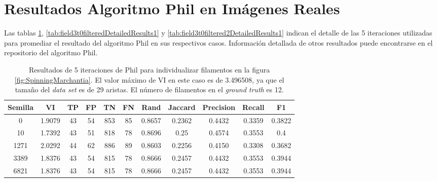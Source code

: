 \section{Resultados Algoritmo Phil en Im\'agenes Reales}

Las tablas \ref{tab:SpinningMarchantiaDetailedResults1},  \ref{tab:field3t0filteredDetailedResults1} y \ref{tab:field3t0filtered2DetailedResults1} indican el detalle de las 5 iteraciones utilizadas para promediar el resultado del algoritmo Phil en sus respectivos casos. Informaci\'on detallada de otros resultados puede encontrarse en el repositorio del algoritmo Phil.

\begin{table}[h]
    \centering
    \begin{tabular}{|c|c|c|c|c|c|c|c|c|c|c|}
    \hline
        Semilla & VI & TP & FP &TN &FN & Rand	& Jaccard &	Precision &	Recall &	F1 \\ \hline 
        0    & 1.9079 & 43 & 54 & 853 & 85 & 0.8657 & 0.2362 & 0.4432 & 0.3359 & 0.3822 \\
        10   & 1.7392 & 43 & 51 & 818 & 78 & 0.8696 & 0.25 & 0.4574 & 0.3553 & 0.4 \\
        1271 & 2.0292 & 44 & 62 & 886 & 89 & 0.8603 & 0.2256 & 0.4150 & 0.3308 & 0.3682 \\
        3389 & 1.8376 & 43 & 54 & 815 & 78 & 0.8666 & 0.2457 & 0.4432 & 0.3553 & 0.3944 \\
        6821 & 1.8376 & 43 & 54 & 815 & 78 & 0.8666 & 0.2457 & 0.4432 & 0.3553 & 0.3944 \\
        \hline
    \end{tabular}
    \caption{Resultados de 5 iteraciones de Phil para individualizar filamentos en la figura \ref{fig:SpinningMarchantia}. El valor m\'aximo de VI en este caso es de 3.496508, ya que el tama\~no del {\it data set} es de 29 aristas. El n\'umero de filamentos en el {\it ground truth} es 12.}
    \label{tab:SpinningMarchantiaDetailedResults1}
\end{table}
\addtocounter{table}{-1}
